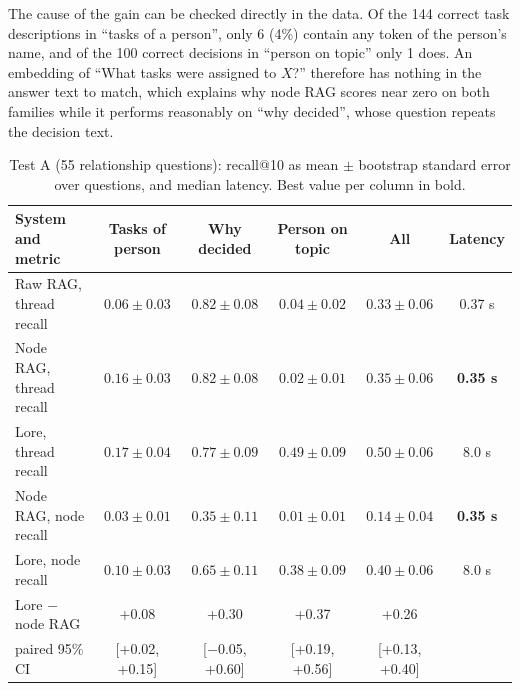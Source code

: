 \documentclass[12pt,onecolumn,draftclsnofoot]{IEEEtran}
\begin{document}
The cause of the gain can be checked directly in the data. Of the 144 correct task descriptions in ``tasks of a person'', only 6 (4\%) contain any token of the person's name, and of the 100 correct decisions in ``person on topic'' only 1 does. An embedding of ``What tasks were assigned to $X$?'' therefore has nothing in the answer text to match, which explains why node RAG scores near zero on both families while it performs reasonably on ``why decided'', whose question repeats the decision text.

\begin{table}[t]
\centering
\caption{Test A (55 relationship questions): recall@10 as mean $\pm$ bootstrap standard error over questions, and median latency. Best value per column in bold.}
\label{tab:testa}
\scriptsize
\setlength{\tabcolsep}{3.5pt}
\begin{tabular}{@{}lccccc@{}}
\toprule
System and metric & Tasks of person & Why decided & Person on topic & All & Latency \\
\midrule
Raw RAG, thread recall & $0.06 \pm 0.03$ & $\mathbf{0.82} \pm 0.08$ & $0.04 \pm 0.02$ & $0.33 \pm 0.06$ & 0.37 s \\
Node RAG, thread recall & $0.16 \pm 0.03$ & $\mathbf{0.82} \pm 0.08$ & $0.02 \pm 0.01$ & $0.35 \pm 0.06$ & \textbf{0.35 s} \\
Lore, thread recall & $\mathbf{0.17} \pm 0.04$ & $0.77 \pm 0.09$ & $\mathbf{0.49} \pm 0.09$ & $\mathbf{0.50} \pm 0.06$ & 8.0 s \\
\midrule
Node RAG, node recall & $0.03 \pm 0.01$ & $0.35 \pm 0.11$ & $0.01 \pm 0.01$ & $0.14 \pm 0.04$ & \textbf{0.35 s} \\
Lore, node recall & $\mathbf{0.10} \pm 0.03$ & $\mathbf{0.65} \pm 0.11$ & $\mathbf{0.38} \pm 0.09$ & $\mathbf{0.40} \pm 0.06$ & 8.0 s \\
Lore $-$ node RAG & +0.08 & +0.30 & +0.37 & +0.26 & \\
\quad paired 95\% CI & [+0.02, +0.15] & [$-$0.05, +0.60] & [+0.19, +0.56] & [+0.13, +0.40] & \\
\bottomrule
\end{tabular}
\end{table}
\end{document}
